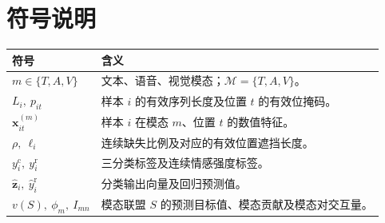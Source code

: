 \section*{符号说明}
\begin{center}
\begin{tabularx}{0.94\textwidth}{@{}lX@{}}
\toprule
符号 & 含义\\
\midrule
$m\in\{T,A,V\}$ & 文本、语音、视觉模态；$\mathcal M=\{T,A,V\}$。\\
$L_i,\ p_{it}$ & 样本 $i$ 的有效序列长度及位置 $t$ 的有效位掩码。\\
$\mathbf x_{it}^{(m)}$ & 样本 $i$ 在模态 $m$、位置 $t$ 的数值特征。\\
$\rho,\ \ell_i$ & 连续缺失比例及对应的有效位置遮挡长度。\\
$y_i^{\mathrm c},\ y_i^{\mathrm r}$ & 三分类标签及连续情感强度标签。\\
$\widehat{\mathbf z}_i,\ \widehat y_i^{\mathrm r}$ & 分类输出向量及回归预测值。\\
$v(S),\ \phi_m,\ I_{mn}$ & 模态联盟 $S$ 的预测目标值、模态贡献及模态对交互量。\\
\bottomrule
\end{tabularx}
\end{center}
